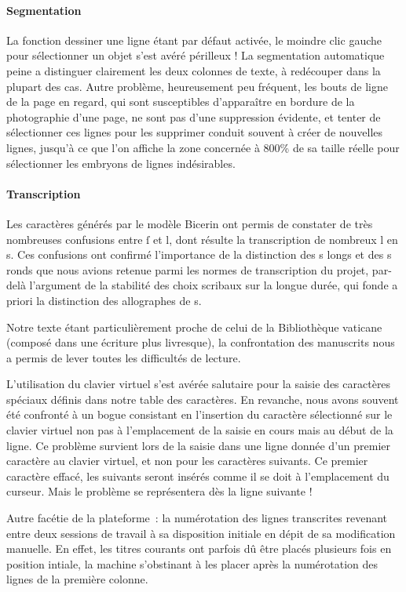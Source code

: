 \documentclass{article}
\begin{document}
\paragraph{Segmentation}
La fonction dessiner une ligne étant par défaut activée, le moindre clic gauche pour sélectionner un objet s'est avéré périlleux ! La segmentation automatique peine a distinguer clairement les deux colonnes de texte, à redécouper dans la plupart des cas. Autre problème, heureusement peu fréquent, les bouts de ligne de la page en regard, qui sont susceptibles d'apparaître en bordure de la photographie d'une page, ne sont pas d'une suppression évidente, et tenter de sélectionner ces lignes pour les supprimer conduit souvent à créer de nouvelles lignes, jusqu'à ce que l'on affiche la zone concernée à 800\% de sa taille réelle pour sélectionner les embryons de lignes indésirables.

\paragraph{Transcription}
Les caractères générés par le modèle Bicerin ont permis de constater de très nombreuses confusions entre ſ et l, dont résulte la transcription de nombreux l en s. Ces confusions ont confirmé l'importance de la distinction des s longs et des s ronds que nous avions retenue parmi les normes de transcription du projet, par-delà l'argument de la stabilité des choix scribaux sur la longue durée, qui fonde a priori la distinction des allographes de s.

Notre texte étant particulièrement proche de celui de la Bibliothèque vaticane (composé dans une écriture plus livresque), la confrontation des manuscrits nous a permis de lever toutes les difficultés de lecture.

L'utilisation du clavier virtuel s'est avérée salutaire pour la saisie des caractères spéciaux définis dans notre table des caractères. En revanche, nous avons souvent été confronté à un bogue consistant en l'insertion du caractère sélectionné sur le clavier virtuel non pas à l'emplacement de la saisie en cours mais au début de la ligne. Ce problème survient lors de la saisie dans une ligne donnée d'un premier caractère au clavier virtuel, et non pour les caractères suivants. Ce premier caractère effacé, les suivants seront insérés comme il se doit à l'emplacement du curseur. Mais le problème se représentera dès la ligne suivante !

Autre facétie de la plateforme~: la numérotation des lignes transcrites revenant entre deux sessions de travail à sa disposition initiale en dépit de sa modification manuelle. En effet, les titres courants ont parfois dû être placés plusieurs fois en position intiale, la machine s'obstinant à les placer après la numérotation des lignes de la première colonne.
\end{document}
